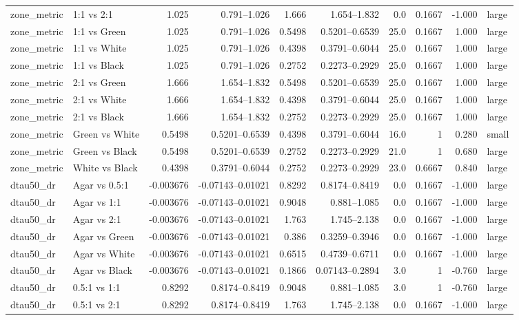 \begin{longtable}{ll rr rr rrr l}
zone_metric & 1:1 vs 2:1 & 1.025 & 0.791–1.026 & 1.666 & 1.654–1.832 & 0.0 & 0.1667 & -1.000 & large \\
zone_metric & 1:1 vs Green & 1.025 & 0.791–1.026 & 0.5498 & 0.5201–0.6539 & 25.0 & 0.1667 & 1.000 & large \\
zone_metric & 1:1 vs White & 1.025 & 0.791–1.026 & 0.4398 & 0.3791–0.6044 & 25.0 & 0.1667 & 1.000 & large \\
zone_metric & 1:1 vs Black & 1.025 & 0.791–1.026 & 0.2752 & 0.2273–0.2929 & 25.0 & 0.1667 & 1.000 & large \\
zone_metric & 2:1 vs Green & 1.666 & 1.654–1.832 & 0.5498 & 0.5201–0.6539 & 25.0 & 0.1667 & 1.000 & large \\
zone_metric & 2:1 vs White & 1.666 & 1.654–1.832 & 0.4398 & 0.3791–0.6044 & 25.0 & 0.1667 & 1.000 & large \\
zone_metric & 2:1 vs Black & 1.666 & 1.654–1.832 & 0.2752 & 0.2273–0.2929 & 25.0 & 0.1667 & 1.000 & large \\
zone_metric & Green vs White & 0.5498 & 0.5201–0.6539 & 0.4398 & 0.3791–0.6044 & 16.0 & 1 & 0.280 & small \\
zone_metric & Green vs Black & 0.5498 & 0.5201–0.6539 & 0.2752 & 0.2273–0.2929 & 21.0 & 1 & 0.680 & large \\
zone_metric & White vs Black & 0.4398 & 0.3791–0.6044 & 0.2752 & 0.2273–0.2929 & 23.0 & 0.6667 & 0.840 & large \\
dtau50_dr & Agar vs 0.5:1 & -0.003676 & -0.07143–0.01021 & 0.8292 & 0.8174–0.8419 & 0.0 & 0.1667 & -1.000 & large \\
dtau50_dr & Agar vs 1:1 & -0.003676 & -0.07143–0.01021 & 0.9048 & 0.881–1.085 & 0.0 & 0.1667 & -1.000 & large \\
dtau50_dr & Agar vs 2:1 & -0.003676 & -0.07143–0.01021 & 1.763 & 1.745–2.138 & 0.0 & 0.1667 & -1.000 & large \\
dtau50_dr & Agar vs Green & -0.003676 & -0.07143–0.01021 & 0.386 & 0.3259–0.3946 & 0.0 & 0.1667 & -1.000 & large \\
dtau50_dr & Agar vs White & -0.003676 & -0.07143–0.01021 & 0.6515 & 0.4739–0.6711 & 0.0 & 0.1667 & -1.000 & large \\
dtau50_dr & Agar vs Black & -0.003676 & -0.07143–0.01021 & 0.1866 & 0.07143–0.2894 & 3.0 & 1 & -0.760 & large \\
dtau50_dr & 0.5:1 vs 1:1 & 0.8292 & 0.8174–0.8419 & 0.9048 & 0.881–1.085 & 3.0 & 1 & -0.760 & large \\
dtau50_dr & 0.5:1 vs 2:1 & 0.8292 & 0.8174–0.8419 & 1.763 & 1.745–2.138 & 0.0 & 0.1667 & -1.000 & large \\

\end{longtable}
